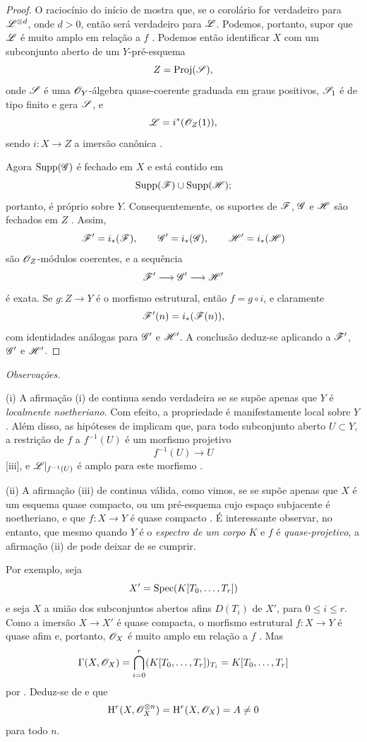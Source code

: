\begin{proof}
O raciocínio do início de  mostra que, se o corolário for verdadeiro para $\mathscr{L}^{\otimes d}$, onde $d>0$, então será verdadeiro para $\mathscr{L}$.
Podemos, portanto, supor que $\mathscr{L}$ é muito amplo em relação a $f$ .
Podemos então identificar $X$ com um subconjunto aberto de um $Y$-pré-esquema
\[
  Z=\operatorname{Proj}(\mathscr{S}),
\]
onde $\mathscr{S}$ é uma $\mathscr{O}_Y$-álgebra quase-coerente graduada em graus positivos, $\mathscr{S}_1$ é de tipo finito e gera $\mathscr{S}$, e
\[
  \mathscr{L}=i^*(\mathscr{O}_Z(1)),
\]
sendo $i:X\to Z$ a imersão canônica .

Agora $\operatorname{Supp}(\mathscr{G})$ é fechado em $X$ e está contido em
\[
  \operatorname{Supp}(\mathscr{F})\cup\operatorname{Supp}(\mathscr{H});
\]
portanto, é próprio sobre $Y$.
Consequentemente, os suportes de $\mathscr{F}$, $\mathscr{G}$ e $\mathscr{H}$ são fechados em $Z$ .
Assim,
\[
  \mathscr{F}'=i_*(\mathscr{F}),\qquad
  \mathscr{G}'=i_*(\mathscr{G}),\qquad
  \mathscr{H}'=i_*(\mathscr{H})
\]
são $\mathscr{O}_Z$-módulos coerentes, e a sequência
\[
  \mathscr{F}'\longrightarrow\mathscr{G}'\longrightarrow\mathscr{H}'
\]
é exata.
Se $g:Z\to Y$ é o morfismo estrutural, então $f=g\circ i$, e claramente
\[
  \mathscr{F}'(n)=i_*(\mathscr{F}(n)),
\]
com identidades análogas para $\mathscr{G}'$ e $\mathscr{H}'$.
A conclusão deduz-se aplicando  a $\mathscr{F}'$, $\mathscr{G}'$ e $\mathscr{H}'$.
\end{proof}

\begin{env}[2.2.5]
\label{III.2.2.5}
\emph{Observações.}

(i) A afirmação (i) de  continua sendo verdadeira se se supõe apenas que $Y$ é \emph{localmente noetheriano}.
Com efeito, a propriedade é manifestamente local sobre $Y$.
Além disso, as hipóteses de  implicam que, para todo subconjunto aberto $U\subset Y$, a restrição de $f$ a $f^{-1}(U)$ é um morfismo projetivo
\[
  f^{-1}(U)\longrightarrow U
\]
[iii], e $\mathscr{L}|_{f^{-1}(U)}$ é amplo para este morfismo .

(ii) A afirmação (iii) de  continua válida, como vimos, se se supõe apenas que $X$ é um esquema quase compacto, ou um pré-esquema cujo espaço subjacente é noetheriano, e que $f:X\to Y$ é quase compacto .
É interessante observar, no entanto, que mesmo quando $Y$ é o \emph{espectro de um corpo} $K$ e $f$ é \emph{quase-projetivo}, a afirmação (ii) de  pode deixar de se cumprir.

Por exemplo, seja
\[
  X'=\operatorname{Spec}(K[T_0,\ldots,T_r])
\]
e seja $X$ a união dos subconjuntos abertos afins $D(T_i)$ de $X'$, para $0\leq i\leq r$.
Como a imersão $X\to X'$ é quase compacta, o morfismo estrutural $f:X\to Y$ é quase afim  e, portanto, $\mathscr{O}_X$ é muito amplo em relação a $f$ .
Mas
\[
  \Gamma(X,\mathscr{O}_X)
  =\bigcap_{i=0}^r(K[T_0,\ldots,T_r])_{T_i}
  =K[T_0,\ldots,T_r]
\]
por .
Deduz-se de  e  que
\[
  \mathrm{H}^r(X,\mathscr{O}_X^{\otimes n})
  =\mathrm{H}^r(X,\mathscr{O}_X)
  =A\neq0
\]
para todo $n$.
\end{env}



